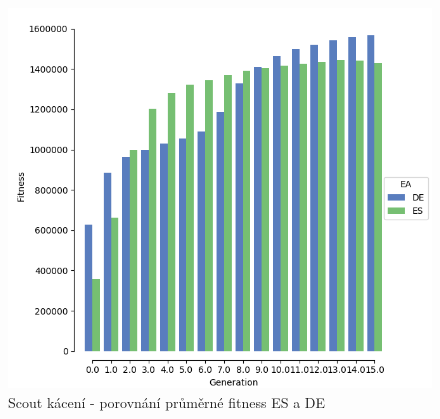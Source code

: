 	\begin{figure}[t]\centering
		\includegraphics[width=\columnwidth]{../img/WoodMap/DEvsES/WCuttorCutMem.png}
		\caption{Scout kácení - porovnání průměrné fitness ES a DE}
		\label{obr04:CutESvsDE}
	\end{figure}
